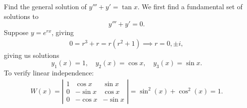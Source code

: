 {\tiny
\begin{example}
    Find the general solution of $y''' + y' = \tan x$. We first find a fundamental set of solutions to \[
    y''' + y' = 0.    
    \]
    Suppose $y = e^{rx}$, giving \begin{align*}
        0 = r^3 + r = r(r^2 + 1) \implies r =0, \pm i,
    \end{align*}
    giving us solutions \[
    y_1(x) = 1, \quad y_2(x) = \cos x, \quad y_3(x) = \sin x.
    \]
    To verify linear independence:
    \begin{align*}
        W(x) = \left|\begin{matrix}
            1 & \cos x & \sin x\\
            0 & - \sin x & \cos x\\
            0 & - \cos x & - \sin x
        \end{matrix}\right| = \sin^2(x) + \cos^2(x) = 1.
    \end{align*}


\end{example}}

